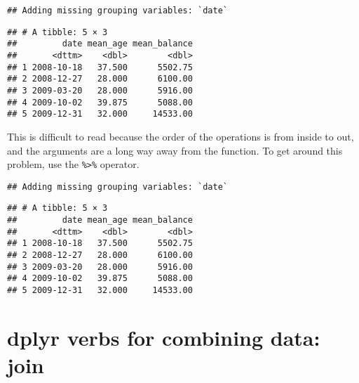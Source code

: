 \documentclass[]{book}
\newenvironment{Shaded}{\begin{snugshade}}{\end{snugshade}}
\newcommand{\KeywordTok}[1]{\textcolor[rgb]{0.13,0.29,0.53}{\textbf{{#1}}}}
\newcommand{\DataTypeTok}[1]{\textcolor[rgb]{0.13,0.29,0.53}{{#1}}}
\newcommand{\DecValTok}[1]{\textcolor[rgb]{0.00,0.00,0.81}{{#1}}}
\newcommand{\StringTok}[1]{\textcolor[rgb]{0.31,0.60,0.02}{{#1}}}
\newcommand{\OtherTok}[1]{\textcolor[rgb]{0.56,0.35,0.01}{{#1}}}
\newcommand{\NormalTok}[1]{{#1}}
\begin{document}
\begin{verbatim}
## Adding missing grouping variables: `date`
\end{verbatim}

\begin{verbatim}
## # A tibble: 5 × 3
##         date mean_age mean_balance
##       <dttm>    <dbl>        <dbl>
## 1 2008-10-18   37.500      5502.75
## 2 2008-12-27   28.000      6100.00
## 3 2009-03-20   28.000      5916.00
## 4 2009-10-02   39.875      5088.00
## 5 2009-12-31   32.000     14533.00
\end{verbatim}

This is difficult to read because the order of the operations is from
inside to out, and the arguments are a long way away from the function.
To get around this problem, use the \texttt{\%\textgreater{}\%}
operator.

\begin{Shaded}
\end{Shaded}

\begin{verbatim}
## Adding missing grouping variables: `date`
\end{verbatim}

\begin{verbatim}
## # A tibble: 5 × 3
##         date mean_age mean_balance
##       <dttm>    <dbl>        <dbl>
## 1 2008-10-18   37.500      5502.75
## 2 2008-12-27   28.000      6100.00
## 3 2009-03-20   28.000      5916.00
## 4 2009-10-02   39.875      5088.00
## 5 2009-12-31   32.000     14533.00
\end{verbatim}

\clearpage

\section{dplyr verbs for combining data:
join}\label{dplyr-verbs-for-combining-data-join}
\end{document}
